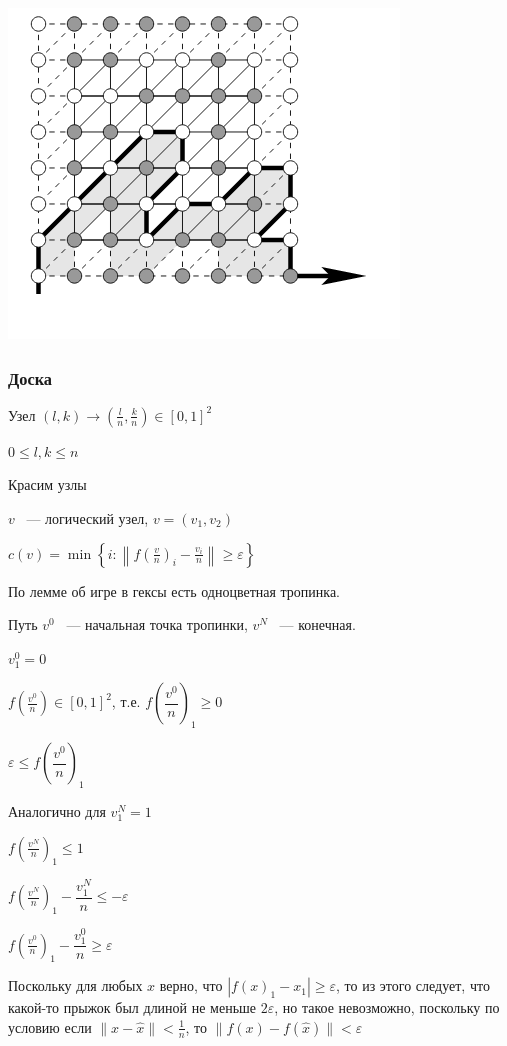 \documentclass{article}
\begin{document}
			\includegraphics[scale=0.45]{HEXTHEOREM.png}
				
        \subsubsection{Доска}
				
            Узел $(l, k) \rightarrow \left(\frac{l}{n}, \frac{k}{n}\right) \in [0, 1]^2$
				
			$0 \leq l, k \leq n$
				
			Красим узлы
				
			$v$ ~--- логический узел, $v = (v_1, v_2)$
				
			$c(v) = \min \left\{ i : \left\| f\left(\frac{v}{n}\right)_i - \frac{v_i}{n} \right\| \geq \varepsilon \right\}$
			
			По лемме об игре в гексы есть одноцветная тропинка.
				
			Путь $v^0$ ~--- начальная точка тропинки, $v^N$ ~--- конечная.
				
			$v^0_1 = 0$
				
			$f\left(\frac{v^0}{n}\right) \in [0, 1]^2$, т.е. $f\left(\dfrac{v^0}{n}\right)_1 \geq 0$
				
			$\varepsilon \leq f\left(\dfrac{v^0}{n}\right)_1$
				
			Аналогично для $v^N_1 = 1$
				
			$f\left(\frac{v^N}{n}\right)_1 \leq 1$
				
			$f\left(\frac{v^N}{n}\right)_1 - \dfrac{v^N_1}{n} \leq -\varepsilon$
				
			$f\left(\frac{v^0}{n}\right)_1 - \dfrac{v^0_1}{n} \geq \varepsilon$
	
			Поскольку для любых $x$ верно, что $|f(x)_1 - x_1| \geq \varepsilon$, то из этого следует, что какой-то прыжок был длиной не меньше $2 \varepsilon$, но такое невозможно, поскольку по условию если $\| x - \widehat{x} \| < \frac{1}{n}$, то $\| f(x) - f(\widehat{x}) \| < \varepsilon$
				
\end{document}
